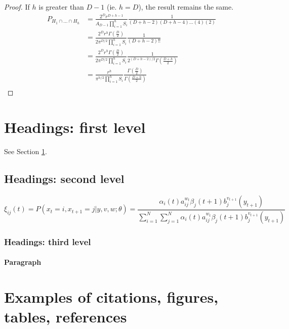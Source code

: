 \documentclass{article}
\begin{document}
\begin{proof}
	If $h$ is greater than $D-1$ (ie. $h=D$), the result remains the same.
	\begin{align}
		P_{H_1\cap\hdots\cap H_h} &= \frac{2^Dr^{D+h-1}}{A_{D-1}\prod_{i=1}^h S_i}  \frac{1}{(D+h-2)(D+h-4)\hdots(4)(2)}  \\
		&= \frac{2^Dr^{h} \Gamma(\frac{D}{2})}{2 \pi^{D/2} \prod_{i=1}^h S_i} \frac{1}{(D+h-2)!!} \\
		&= \frac{2^Dr^{h} \Gamma(\frac{D}{2})}{2 \pi^{D/2} \prod_{i=1}^h S_i} \frac{1}{2^{(D+h-2)/2} \Gamma(\frac{D+h}{2})} \\
		&= \frac{r^{h}}{\pi^{h/2} \prod_{i=1}^h S_i} \frac{\Gamma(\frac{D}{2})}{\Gamma(\frac{D+h}{2})} \\
	\end{align}


\end{proof}

\section{Headings: first level}
\label{sec:headings}

\lipsum[4] See Section \ref{sec:headings}.

\subsection{Headings: second level}
\lipsum[5]
\begin{equation} 
	\xi _{ij}(t)=P(x_{t}=i,x_{t+1}=j|y,v,w;\theta)= {\frac {\alpha _{i}(t)a^{w_t}_{ij}\beta _{j}(t+1)b^{v_{t+1}}_{j}(y_{t+1})}{\sum _{i=1}^{N} \sum _{j=1}^{N} \alpha _{i}(t)a^{w_t}_{ij}\beta _{j}(t+1)b^{v_{t+1}}_{j}(y_{t+1})}}
\end{equation}



\subsubsection{Headings: third level}
\lipsum[6]

\paragraph{Paragraph}
\lipsum[7]



\section{Examples of citations, figures, tables, references}
\label{sec:others}
\end{document}
